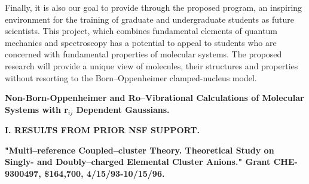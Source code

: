 Finally, it is also our goal to
provide through the proposed program, an inspiring environment 
for the training of graduate and undergraduate students as
future scientists. This project, which combines fundamental elements of 
quantum mechanics and spectroscopy has a potential to appeal
to students who are 
concerned with 
fundamental properties of molecular systems.
The proposed research will provide a unique view of molecules,
their structures and properties without resorting to
the Born--Oppenheimer clamped-nucleus model.


\newpage



\setcounter{page}{1}

\begin{center}
{\Large \bf 
Non-Born-Oppenheimer and Ro--Vibrational Calculations of
Molecular Systems with r$_{ij}$ Dependent Gaussians.}

\end{center}


\vspace{2mm}

\noindent
{\bf I. RESULTS FROM PRIOR NSF SUPPORT.}


\noindent
{\bf "Multi--reference Coupled--cluster Theory. 
Theoretical Study on Singly- and Doubly--charged Elemental 
Cluster Anions."  Grant CHE-9300497,  \$164,700, 4/15/93-10/15/96.}

\vspace{3mm}

